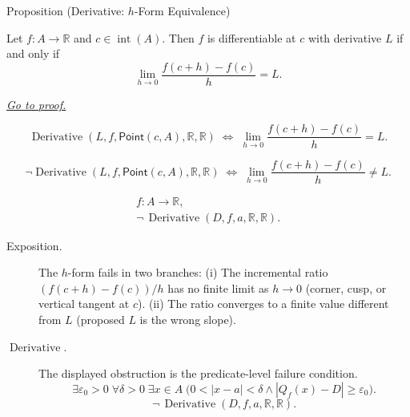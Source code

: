 
\begin{propositionbox}{Proposition (Derivative: $h$-Form Equivalence)}
\begin{proposition}
\label{prop:derivative-h-form-equivalence}
Let $f : A \to \mathbb{R}$ and $c \in \operatorname{int}(A)$. Then $f$ is differentiable at $c$ with derivative $L$ if and only if
\[
\lim_{h \to 0} \frac{f(c+h) - f(c)}{h} = L.
\]

\smallskip\noindent
\hyperref[prf:derivative-h-form-equivalence]{\textit{Go to proof.}}
\end{proposition}
\end{propositionbox}

\begin{remark*}
\[
\operatorname{Derivative}(L,f,\mathsf{Point}(c,A),\mathbb R,\mathbb R)
\;\Longleftrightarrow\;
\lim_{h\to 0}\frac{f(c+h)-f(c)}{h} = L.
\]
\end{remark*}

\begin{remark*}
\[
\neg\operatorname{Derivative}(L,f,\mathsf{Point}(c,A),\mathbb R,\mathbb R)
\;\Longleftrightarrow\;
\lim_{h\to 0}\frac{f(c+h)-f(c)}{h} \neq L.
\]
\end{remark*}

\begin{remark*}
\[
\begin{aligned}
  f\colon A\to\mathbb{R},\\
\neg\,\operatorname{Derivative}(D,f,a,\mathbb{R},\mathbb{R}).
\end{aligned}
\]
\end{remark*}


\begin{remark*}
\begin{description}
  \item[Exposition.]
The $h$-form fails in two branches: (i) The incremental ratio $(f(c+h)-f(c))/h$ has no finite limit as $h \to 0$ (corner, cusp, or vertical tangent at $c$). (ii) The ratio converges to a finite value different from $L$ (proposed $L$ is the wrong slope).


  \item[\(\operatorname{Derivative}.\)]
  The displayed obstruction is the predicate-level failure condition.
  \[
  \exists\varepsilon_0>0\;\forall\delta>0\;\exists x\in A\;\bigl(0<|x-a|<\delta\land |Q_f(x)-D|\ge\varepsilon_0\bigr).
  \]
  \[
  \neg\,\operatorname{Derivative}(D,f,a,\mathbb{R},\mathbb{R}).
  \]
\end{description}
\end{remark*}

